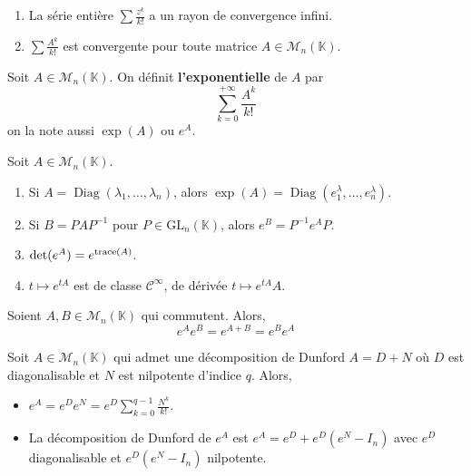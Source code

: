 	
	\begin{lemma}
		\begin{enumerate}[label=(\roman*)]
			\item La série entière $\sum \frac{z^k}{k!}$ a un rayon de convergence infini.
			\item $\sum \frac{A^k}{k!}$ est convergente pour toute matrice $A \in \mathcal{M}_n(\mathbb{K})$.
		\end{enumerate}
	\end{lemma}
	
	\begin{definition}
		Soit $A \in \mathcal{M}_n(\mathbb{K})$. On définit \textbf{l'exponentielle} de $A$ par
		\[ \sum_{k=0}^{+\infty} \frac{A^k}{k!} \]
		on la note aussi $\exp(A)$ ou $e^A$.
	\end{definition}
	
	\begin{theorem}
		Soit $A \in \mathcal{M}_n(\mathbb{K})$.
		\begin{enumerate}[label=(\roman*)]
			\item Si $A = \operatorname{Diag}(\lambda_1, \dots, \lambda_n)$, alors $\exp(A) = \operatorname{Diag}(e^\lambda_1, \dots, e^\lambda_n)$.
			\item Si $B = PAP^{-1}$ pour $P \in \mathrm{GL}_n(\mathbb{K})$, alors $e^B = P^{-1} e^A P$.
			\item $\det(e^A) = e^{\operatorname{trace}(A)}$.
			\item $t \mapsto e^{tA}$ est de classe $\mathcal{C}^\infty$, de dérivée $t \mapsto e^{tA}A$.
		\end{enumerate}
	\end{theorem}
	
	\begin{proposition}
		Soient $A, B \in \mathcal{M}_n(\mathbb{K})$ qui commutent. Alors,
		\[ e^A e^B = e^{A+B} = e^B e^A \]
	\end{proposition}
	
	\begin{example}
		Soit $A \in \mathcal{M}_n(\mathbb{K})$ qui admet une décomposition de Dunford $A = D+N$ où $D$ est diagonalisable et $N$ est nilpotente d'indice $q$. Alors,
		\begin{itemize}
			\item $e^A = e^D e^N = e^D \sum_{k=0}^{q-1} \frac{N^k}{k!}$.
			\item La décomposition de Dunford de $e^A$ est $e^A = e^D + e^D(e^N - I_n)$ avec $e^D$ diagonalisable et $e^D(e^N - I_n)$ nilpotente.
		\end{itemize}
	\end{example}
	
